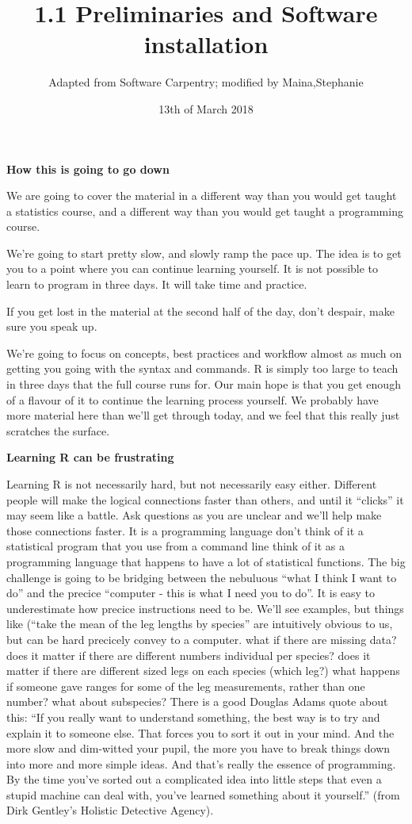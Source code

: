 \documentclass[]{article}
\title{1.1 Preliminaries and Software installation}
\author{Adapted from Software Carpentry; modified by Maina,Stephanie}
\date{13th of March 2018}
\begin{document}
\maketitle

\textbf{How this is going to go down}

We are going to cover the material in a different way than you would get
taught a statistics course, and a different way than you would get
taught a programming course.

We're going to start pretty slow, and slowly ramp the pace up. The idea
is to get you to a point where you can continue learning yourself. It is
not possible to learn to program in three days. It will take time and
practice.

If you get lost in the material at the second half of the day, don't
despair, make sure you speak up.

We're going to focus on concepts, best practices and workflow almost as
much on getting you going with the syntax and commands. R is simply too
large to teach in three days that the full course runs for. Our main
hope is that you get enough of a flavour of it to continue the learning
process yourself. We probably have more material here than we'll get
through today, and we feel that this really just scratches the surface.

\textbf{Learning R can be frustrating}

Learning R is not necessarily hard, but not necessarily easy either.
Different people will make the logical connections faster than others,
and until it ``clicks'' it may seem like a battle. Ask questions as you
are unclear and we'll help make those connections faster. It is a
programming language don't think of it a statistical program that you
use from a command line think of it as a programming language that
happens to have a lot of statistical functions. The big challenge is
going to be bridging between the nebuluous ``what I think I want to do''
and the precice ``computer - this is what I need you to do''. It is easy
to underestimate how precice instructions need to be. We'll see
examples, but things like (``take the mean of the leg lengths by
species'' are intuitively obvious to us, but can be hard precicely
convey to a computer. what if there are missing data? does it matter if
there are different numbers individual per species? does it matter if
there are different sized legs on each species (which leg?) what happens
if someone gave ranges for some of the leg measurements, rather than one
number? what about subspecies? There is a good Douglas Adams quote about
this: ``If you really want to understand something, the best way is to
try and explain it to someone else. That forces you to sort it out in
your mind. And the more slow and dim-witted your pupil, the more you
have to break things down into more and more simple ideas. And that's
really the essence of programming. By the time you've sorted out a
complicated idea into little steps that even a stupid machine can deal
with, you've learned something about it yourself.'' (from Dirk Gentley's
Holistic Detective Agency).
\end{document}
